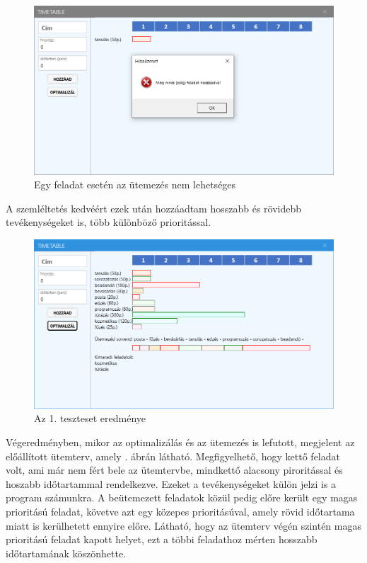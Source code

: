 \begin{figure}[h!]
	\centering
	\includegraphics[width=\textwidth]{images/test/notEnoughTasks.png}
	\caption{Egy feladat esetén az ütemezés nem lehetséges}
	\label{fig:notEnoughTasks}
\end{figure}

A szemléltetés kedvéért ezek után hozzáadtam hosszabb és rövidebb tevékenységeket is, több különböző prioritással. 

\begin{figure}[h!]
	\centering
	\includegraphics[width=\textwidth]{images/test/result1.png}
	\caption{Az 1. teszteset eredménye}
	\label{fig:result1}
\end{figure}

Végeredményben, mikor az optimalizálás és az ütemezés is lefutott, megjelent az előállított ütemterv, amely . ábrán látható. Megfigyelhető, hogy kettő feladat volt, ami már nem fért bele az ütemtervbe, mindkettő alacsony piroritással és hoszabb időtartammal rendelkezve. Ezeket a tevékenységeket külön jelzi is a program számunkra. A beütemezett feladatok közül pedig előre került egy magas prioritású feladat, követve azt egy közepes prioritásúval, amely rövid időtartama miatt is kerülhetett ennyire előre. Látható, hogy az ütemterv végén szintén magas prioritású feladat kapott helyet, ezt a többi feladathoz mérten hosszabb időtartamának köszönhette.


